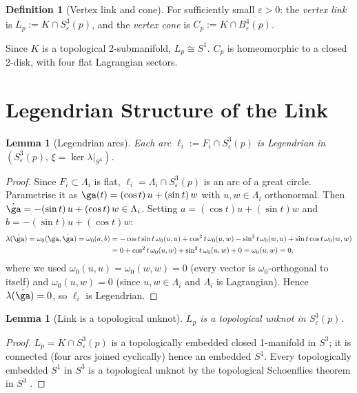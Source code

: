 \documentclass[12pt]{article}
\newtheorem{lemma}[theorem]{Lemma}
\theoremstyle{definition}
\newtheorem{definition}[theorem]{Definition}
\newcommand{\La}{\Lambda}
\newcommand{\om}{\omega}
\newcommand{\eps}{\varepsilon}
\begin{document}
\begin{definition}[Vertex link and cone]\label{def:link}
For sufficiently small $\eps>0$: the \emph{vertex link} is
$L_p:=K\cap S^3_\eps(p)$, and the \emph{vertex cone} is
$C_p:=K\cap\overline{B^4_\eps(p)}$.
\end{definition}

Since $K$ is a topological 2-submanifold, $L_p\cong S^1$.  $C_p$
is homeomorphic to a closed 2-disk, with four flat Lagrangian sectors.

\section{Legendrian Structure of the Link}\label{sec:legendrian}

\begin{lemma}[Legendrian arcs]\label{lem:legendrian_arc}
Each arc $\ell_i:=F_i\cap S^3_\eps(p)$ is Legendrian in
$(S^3_\eps(p),\,\xi=\ker\lambda|_{S^3})$.
\end{lemma}

\begin{proof}
Since $F_i\subset\La_i$ is flat, $\ell_i=\La_i\cap S^3_\eps(p)$ is an
arc of a great circle.  Parametrise it as $\ga(t)=(\cos t)\,u+(\sin t)\,w$
with $u,w\in\La_i$ orthonormal.  Then $\dot\ga=-(\sin t)\,u+(\cos t)\,w\in\La_i$.
Setting $a = (\cos t)u + (\sin t)w$ and $b = -(\sin t)u + (\cos t)w$:
\begin{align*}
  \lambda(\dot\ga)
  = \om_0(\ga,\dot\ga)
  = \om_0(a,b)
  &= -\cos t\sin t\,\om_0(u,u)
   + \cos^2t\,\om_0(u,w)
   - \sin^2t\,\om_0(w,u)
   + \sin t\cos t\,\om_0(w,w)\\
  &= 0 + \cos^2t\,\om_0(u,w) + \sin^2t\,\om_0(u,w) + 0
   = \om_0(u,w) = 0,
\end{align*}
where we used $\om_0(u,u)=\om_0(w,w)=0$ (every vector is $\om_0$-orthogonal to itself)
and $\om_0(u,w)=0$ (since $u,w\in\La_i$ and $\La_i$ is Lagrangian).
Hence $\lambda(\dot\ga)=0$, so $\ell_i$ is Legendrian.
\end{proof}

\begin{lemma}[Link is a topological unknot]\label{lem:unknot}
$L_p$ is a topological unknot in $S^3_\eps(p)$.
\end{lemma}

\begin{proof}
$L_p=K\cap S^3_\eps(p)$ is a topologically embedded closed 1-manifold
in $S^3$; it is connected (four arcs joined cyclically) hence an
embedded $S^1$.  Every topologically embedded $S^1$ in $S^3$ is a
topological unknot by the topological Schoenflies theorem in $S^3$
\cite[Appendix~B]{Ro76}.
\end{proof}
\end{document}
